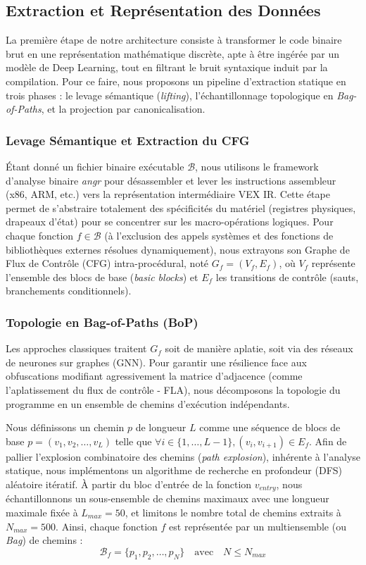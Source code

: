 \subsection{Extraction et Représentation des Données}\label{sub:Extraction et Représentation des Données} %
La première étape de notre architecture consiste à transformer le code binaire brut en une représentation mathématique discrète, apte à être ingérée par un modèle de Deep Learning, tout en filtrant le bruit syntaxique induit par la compilation. Pour ce faire, nous proposons un pipeline d'extraction statique en trois phases : le levage sémantique (\textit{lifting}), l'échantillonnage topologique en \textit{Bag-of-Paths}, et la projection par canonicalisation.

\subsubsection{Levage Sémantique et Extraction du CFG}
Étant donné un fichier binaire exécutable $\mathcal{B}$, nous utilisons le framework d'analyse binaire \textit{angr} pour désassembler et lever les instructions assembleur (x86, ARM, etc.) vers la représentation intermédiaire VEX IR. Cette étape permet de s'abstraire totalement des spécificités du matériel (registres physiques, drapeaux d'état) pour se concentrer sur les macro-opérations logiques. 
Pour chaque fonction $f \in \mathcal{B}$ (à l'exclusion des appels systèmes et des fonctions de bibliothèques externes résolues dynamiquement), nous extrayons son Graphe de Flux de Contrôle (CFG) intra-procédural, noté $G_f = (V_f, E_f)$, où $V_f$ représente l'ensemble des blocs de base (\textit{basic blocks}) et $E_f$ les transitions de contrôle (sauts, branchements conditionnels).

\subsubsection{Topologie en Bag-of-Paths (BoP)}
Les approches classiques traitent $G_f$ soit de manière aplatie, soit via des réseaux de neurones sur graphes (GNN). Pour garantir une résilience face aux obfuscations modifiant agressivement la matrice d'adjacence (comme l'aplatissement du flux de contrôle - FLA), nous décomposons la topologie du programme en un ensemble de chemins d'exécution indépendants.

Nous définissons un chemin $p$ de longueur $L$ comme une séquence de blocs de base $p = (v_1, v_2, \dots, v_L)$ telle que $\forall i \in \{1, \dots, L-1\}, (v_i, v_{i+1}) \in E_f$.
Afin de pallier l'explosion combinatoire des chemins (\textit{path explosion}), inhérente à l'analyse statique, nous implémentons un algorithme de recherche en profondeur (DFS) aléatoire itératif. À partir du bloc d'entrée de la fonction $v_{entry}$, nous échantillonnons un sous-ensemble de chemins maximaux avec une longueur maximale fixée à $L_{max} = 50$, et limitons le nombre total de chemins extraits à $N_{max} = 500$.
Ainsi, chaque fonction $f$ est représentée par un multiensemble (ou \textit{Bag}) de chemins :
\begin{equation}
    \mathcal{B}_{f} = \{ p_1, p_2, \dots, p_N \} \quad \text{avec} \quad N \leq N_{max}
\end{equation}

